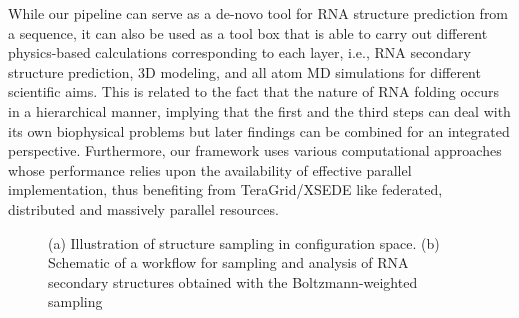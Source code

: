 \documentclass[a4paper,11pt]{article}
\newcommand{\up}{\vspace*{-1em}}
\begin{document}
While our pipeline can serve as a de-novo tool for RNA structure prediction from a sequence, it can also be used as a tool box that is able to carry out different physics-based calculations corresponding to each layer, i.e., RNA secondary structure prediction, 3D modeling, and all atom MD simulations for different scientific aims.  This is related to the fact that the nature of RNA folding occurs in a hierarchical manner, implying that the first and the third steps can deal with its own biophysical problems but later findings can be combined for an integrated perspective. Furthermore, our framework uses various computational approaches whose performance relies upon the availability of effective parallel implementation, thus benefiting from TeraGrid/XSEDE like federated, distributed and massively parallel resources.

\begin{figure}
\begin{center}
\end{center}
\up\up
\caption{(a) Illustration of structure sampling in configuration space.  (b) Schematic of a workflow for sampling and analysis of RNA secondary structures obtained with the Boltzmann-weighted sampling}
\label{fig:folding energy landscape}
\end{figure}
\end{document}
